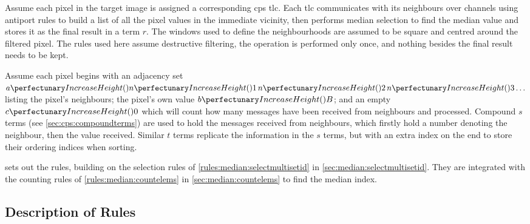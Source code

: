 Assume each pixel in the target image is assigned a corresponding \gls{cps} \gls{tlc}.  Each \gls{tlc} communicates with its neighbours over channels using antiport rules to build a list of all the pixel values in the immediate vicinity, then performs median selection to find the median value and stores it as the final result in a term \(r\).  The windows used to define the neighbourhoods are assumed to be square and centred around the filtered pixel. The rules used here assume destructive filtering, \ie{} the operation is performed only once, and nothing besides the final result needs to be kept.

Assume each pixel begins with an adjacency set \(\cpfunc{a}{\cpfunc{n}{1} \, \cpfunc{n}{2} \, \cpfunc{n}{3} \ldots}\) listing the pixel's neighbours; the pixel's own value \(\cpfunc{b}{B}\); and an empty \(\cpfunc{c}{0}\) which will count how many messages have been received from neighbours and processed.   Compound \(s\) terms (see \vref{sec:cps:compoundterms}) are used to hold the messages received from neighbours, which firstly hold a number denoting the neighbour, then the value received. Similar \(t\) terms replicate the information in the \(s\) terms, but with an extra index on the end to store their ordering indices when sorting.

 sets out the rules, building on the selection rules of \vref{rules:median:selectmultisetid} in \cref{sec:median:selectmultisetid}.  They are integrated with the counting rules of \vref{rules:median:countelems} in \cref{sec:median:countelems} to find the median index.

\subsection{Description of Rules}


